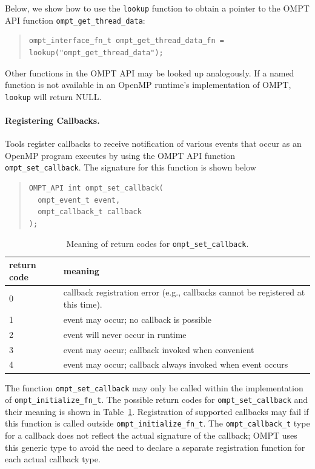 \documentclass{article}
\begin{document}
Below, we show how to use the \verb|lookup| function to obtain a pointer to the OMPT API function \verb|ompt_get_thread_data|:

\begin{quote}
\begin{verbatim}
ompt_interface_fn_t ompt_get_thread_data_fn = lookup("ompt_get_thread_data");
\end{verbatim}
\end{quote}
Other functions in the OMPT API may be looked up analogously.
If a named function is not available in an OpenMP runtime's implementation of OMPT, \verb|lookup| will return NULL.

\paragraph{Registering Callbacks.} 
Tools register callbacks to receive notification of various events that occur as an OpenMP program executes by using the OMPT API function \verb|ompt_set_callback|. The signature for this function is shown below{
 
\begin{quote}
\begin{verbatim}
OMPT_API int ompt_set_callback(
  ompt_event_t event, 
  ompt_callback_t callback
);
\end{verbatim}
\end{quote}
}

\begin{table}
\centering
\begin{tabular}{|l|l|}
\hline
return code & meaning \\\hline
0 & callback registration error (e.g., callbacks cannot be registered at this time).\\\hline
1 & event may occur; no callback is possible\\\hline
2 & event will never occur in runtime\\\hline
3 & event may occur; callback invoked when convenient\\\hline
4 & event may occur; callback always invoked when event occurs\\\hline
\end{tabular}
\caption{Meaning of return codes for {\tt ompt\_set\_callback}.}
\label{table:set_rc}
\end{table}

\noindent
The  function \verb|ompt_set_callback|  may only be called within the implementation of 
 \verb|ompt_initialize_fn_t|.
The possible return codes for \verb|ompt_set_callback| and their meaning is shown in Table~\ref{table:set_rc}. 
Registration of supported callbacks may fail if this function is
called outside  \verb|ompt_initialize_fn_t|.
The \verb|ompt_callback_t| type for a callback does not reflect the actual signature of the callback; OMPT uses  this generic type 
 to avoid the need to declare a separate registration function for each actual callback type.
\end{document}
